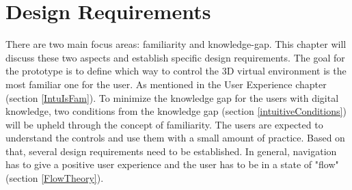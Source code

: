 \section{Design Requirements}\label{DesignRequirements}
There are two main focus areas: familiarity and knowledge-gap. This chapter will discuss these two aspects and establish specific design requirements. 
The goal for the prototype is to define which way to control the 3D virtual environment is the most familiar one for the user. As mentioned in the User Experience chapter (section \ref{IntuIsFam}).
To minimize the knowledge gap for the users with digital knowledge, two conditions from the knowledge gap (section \ref{intuitiveConditions}) will be upheld through the concept of familiarity. The users are expected to understand the controls and use them with a small amount of practice. Based on that, several design requirements need to be established. In general, navigation has to give a positive user experience and the user has to be in a state of "flow" (section \ref{FlowTheory}). 

